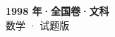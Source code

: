 \documentclass[zihao=-4, a4paper]{ctexart}
\begin{document}
\begin{center}
  {\Large\bfseries 1998 年·全国卷·文科}\\[4pt]
  {\large 数学 · 试题版}
\end{center}
\medskip
{}

\end{document}
